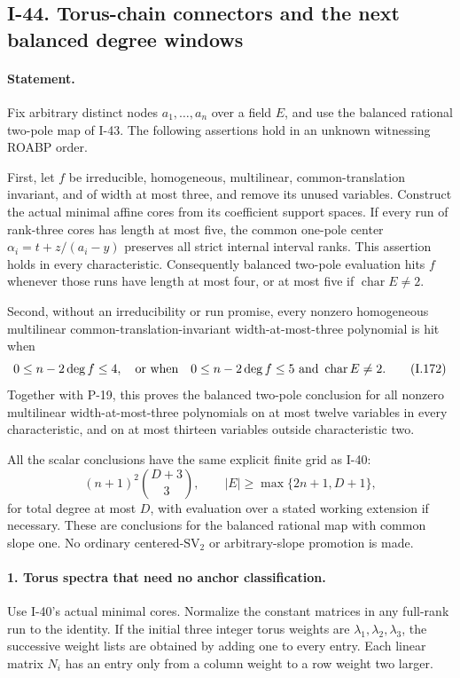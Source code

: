\subsection{I-44. Torus-chain connectors and the next balanced degree windows}
\label{I-44}

\paragraph{Statement.}
Fix arbitrary distinct nodes $a_1,\ldots,a_n$ over a field
$E$, and use the balanced rational two-pole map of I-43.
The following assertions hold in an unknown witnessing
ROABP order.

First, let $f$ be irreducible, homogeneous, multilinear,
common-translation invariant, and of width at most three,
and remove its unused variables. Construct the actual minimal
affine cores from its coefficient support spaces. If every
run of rank-three cores has length at most five, the common
one-pole center $\alpha_i=t+z/(a_i-y)$ preserves all strict
internal interval ranks. This assertion holds in every
characteristic. Consequently balanced two-pole evaluation
hits $f$ whenever those runs have length at most four, or
at most five if $\operatorname{char}E\ne2$.

Second, without an irreducibility or run promise, every
nonzero homogeneous multilinear common-translation-invariant
width-at-most-three polynomial is hit when
\[
 0\le n-2\deg f\le4,
 \quad\hbox{or when}\quad
 0\le n-2\deg f\le5\ \hbox{and }\operatorname{char}E\ne2.
 \tag{I.172}
\]
Together with P-19, this proves the balanced two-pole
conclusion for all nonzero multilinear width-at-most-three
polynomials on at most twelve variables in every
characteristic, and on at most thirteen variables outside
characteristic two.

All the scalar conclusions have the same explicit finite
grid as I-40:
\[
 (n+1)^2\binom{D+3}{3},\qquad
 |E|\ge\max\{2n+1,D+1\},
 \tag{I.173}
\]
for total degree at most $D$, with evaluation over a stated
working extension if necessary. These are conclusions for
the balanced rational map with common slope one. No ordinary
centered-$\mathrm{SV}_2$ or arbitrary-slope promotion is made.

\paragraph{1. Torus spectra that need no anchor classification.}
Use I-40's actual minimal cores. Normalize the constant
matrices in any full-rank run to the identity. If the initial
three integer torus weights are $\lambda_1,\lambda_2,
\lambda_3$, the successive weight lists are obtained by
adding one to every entry. Each linear matrix $N_i$ has an
entry only from a column weight to a row weight two larger.

